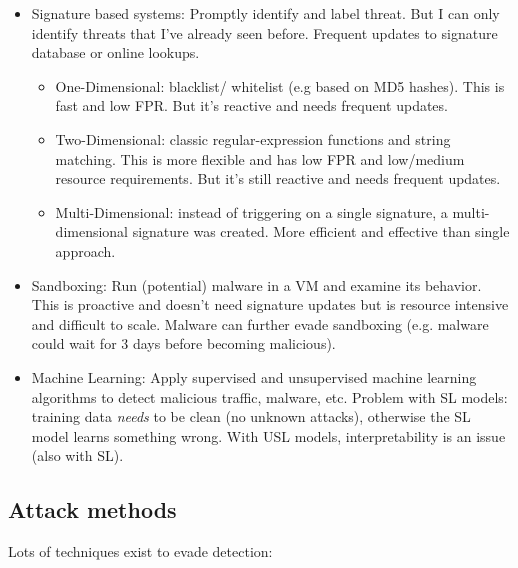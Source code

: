 \documentclass[11pt,oneside,a4paper]{article}
\begin{document}
\vspace{-\topsep}
\begin{itemize}
	\setlength{\itemsep}{0pt}
	\setlength{\parskip}{0pt}
	\item Signature based systems: Promptly identify and label threat. But I can only identify threats that I've already seen before. Frequent updates to signature database or online lookups.
	\begin{itemize}
		\item One-Dimensional: blacklist/ whitelist (e.g based on MD5 hashes). This is fast and low FPR. But it's reactive and needs frequent updates.
		\item Two-Dimensional: classic regular-expression functions and string matching. This is more flexible and has low FPR and low/medium resource requirements. But it's still reactive and needs frequent updates.
		\item Multi-Dimensional: instead of triggering on a single signature, a	multi-dimensional signature was created. More efficient and effective than single approach.
	\end{itemize}
	\item Sandboxing: Run (potential) malware in a VM and examine its behavior. This is proactive and doesn't need signature updates but is resource intensive and difficult to scale. Malware can further evade sandboxing (e.g. malware could wait for 3 days before becoming malicious).
	\item Machine Learning: Apply supervised and unsupervised machine learning algorithms to detect malicious traffic, malware, etc. Problem with SL models: training data \textit{needs} to be clean (no unknown attacks), otherwise the SL model learns something wrong. With USL models, interpretability is an issue (also with SL).
\end{itemize}
\vspace{-\topsep}

\subsection{Attack methods}

Lots of techniques exist to evade detection:
\end{document}
